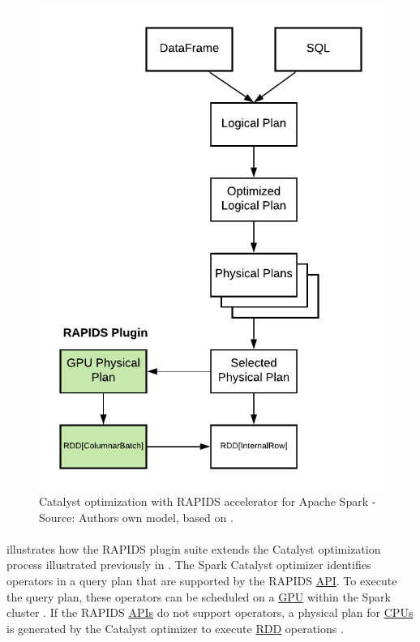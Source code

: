 \begin{figure}[h]
\centering
\includegraphics[scale=1]{images/04_technical_background/rapids/rapids_catalyst_optimization_process}
\caption{Catalyst optimization with RAPIDS accelerator for Apache Spark - Source: Authors own model, based on \cite{Mcdonald2020SparkRapids}.}
\label{fig:04_rapids_ext_query-plan}
\end{figure}
\paragraph{} illustrates how the RAPIDS plugin suite extends the Catalyst optimization process illustrated previously in .
The Spark Catalyst optimizer identifies operators in a query plan that are supported by the RAPIDS \hyperlink{abbr:api}{API}. To execute the query plan, these operators can be scheduled on a \hyperlink{abbr:gpu}{GPU} within the Spark cluster \cite{Mcdonald2020SparkRapids}. If the RAPIDS \hyperlink{abbr:api}{APIs} do not support operators, a physical plan for \hyperlink{abbr:cpu}{CPUs} is generated by the Catalyst optimizer to execute \hyperlink{abbr:rdd}{RDD} operations \cite{Mcdonald2020SparkRapids}.


